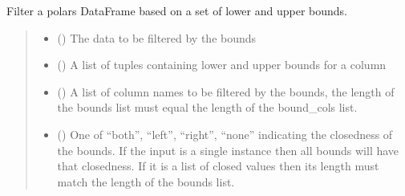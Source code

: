 \documentclass[letterpaper,10pt,english]{sphinxmanual}
\begin{document}

\begin{fulllineitems}
\label{\detokenize{misc:glomar_gridding.utils.filter_bounds}}
\pysigstartsignatures
\pysiglinewithargsret
{}
{\sphinxparamcomma {}\sphinxparamcomma {}\sphinxparamcomma {}}
{}
\pysigstopsignatures
\sphinxAtStartPar
Filter a polars DataFrame based on a set of lower and upper bounds.
\begin{quote}\begin{description}
\begin{itemize}
\item {}
\sphinxAtStartPar
{} () \textendash{} The data to be filtered by the bounds

\item {}
\sphinxAtStartPar
{} (\sphinxstyleliteralemphasis{\sphinxupquote{{[}}}\sphinxstyleliteralemphasis{\sphinxupquote{{[}}}\sphinxstyleliteralemphasis{\sphinxupquote{, }}\sphinxstyleliteralemphasis{\sphinxupquote{{]}}}\sphinxstyleliteralemphasis{\sphinxupquote{{]}}}) \textendash{} A list of tuples containing lower and upper bounds for a column

\item {}
\sphinxAtStartPar
{} (\sphinxstyleliteralemphasis{\sphinxupquote{{[}}}\sphinxstyleliteralemphasis{\sphinxupquote{{]}}}) \textendash{} A list of column names to be filtered by the bounds, the length of
the bounds list must equal the length of the bound\_cols list.

\item {}
\sphinxAtStartPar
{} (\sphinxstyleliteralemphasis{\sphinxupquote{ | }}\sphinxstyleliteralemphasis{\sphinxupquote{{[}}}\sphinxstyleliteralemphasis{\sphinxupquote{{]}}}) \textendash{} One of “both”, “left”, “right”, “none” indicating the closedness of
the bounds. If the input is a single instance then all bounds will have
that closedness. If it is a list of closed values then its length must
match the length of the bounds list.


\end{itemize}
\end{description}
\end{quote}
\end{fulllineitems}
\end{document}
